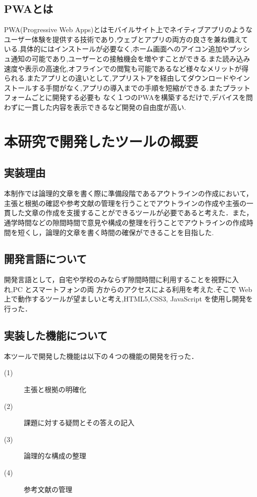 \documentclass[a4j,12pt]{jarticle}
\begin{document}
\subsection{PWAとは}
PWA(Progressive Web Apps)とはモバイルサイト上でネイティブアプリのようなユーザー体験を提供する技術であり,ウェブとアプリの両方の良さを兼ね備えている.具体的にはインストールが必要なく,ホーム画面へのアイコン追加やプッシュ通知の可能であり,ユーザーとの接触機会を増やすことができる.また読み込み速度や表示の高速化,オフラインでの閲覧も可能であるなど様々なメリットが得られる.またアプリとの違いとして,アプリストアを経由してダウンロードやインストールする手間がなく,アプリの導入までの手順を短縮ができる.またプラットフォームごとに開発する必要も
なく１つのPWAを構築するだけで,デバイスを問わずに一貫した内容を表示できるなど開発の自由度が高い\cite{ren6}.
\newpage
\section{本研究で開発したツールの概要}
\subsection{実装理由}
本制作では論理的文章を書く際に準備段階であるアウトラインの作成において，主張と根拠の確認や参考文献の管理を行うことでアウトラインの作成や主張の一貫した文章の作成を支援することができるツールが必要であると考えた．また，通学時間などの隙間時間で意見や構成の整理を行うことでアウトラインの作成時間を短くし，論理的文章を書く時間の確保ができることを目指した.

\subsection{開発言語について}
開発言語として，自宅や学校のみならず隙間時間に利用することを視野に入れ,PC とスマートフォンの両
方からのアクセスによる利用を考えた.そこで Web 上で動作するツールが望ましいと考え,HTML5,CSS3, JavaScript を使用し開発を行った．
\subsection{実装した機能について}
本ツールで開発した機能は以下の４つの機能の開発を行った．
\begin{description}
  \item[(1)] 主張と根拠の明確化
  \item[(2)] 課題に対する疑問とその答えの記入
  \item[(3)] 論理的な構成の整理
  \item[(4)] 参考文献の管理
 \end{description}
\end{document}
